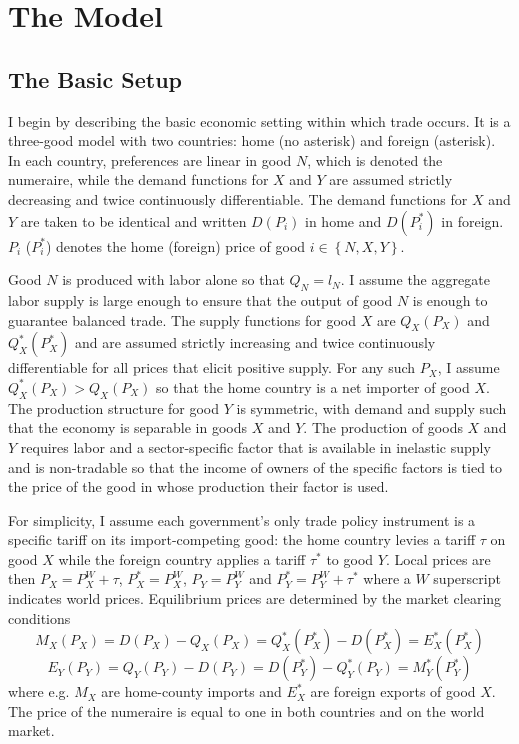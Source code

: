 \documentclass[10pt]{article}
\begin{document}
\section{The Model}
\label{sec:model}

\subsection{The Basic Setup}
\label{sec:basic}
I begin by describing the basic economic setting within which trade occurs. It is a three-good model with two countries: home (no asterisk) and foreign (asterisk). In each country, preferences are linear in good $N$, which is denoted the numeraire, while the demand functions for $X$ and $Y$ are assumed strictly decreasing and twice continuously differentiable. The demand functions for $X$ and $Y$ are taken to be identical and written $D(P_i)$ in home and $D(P_i^*)$ in foreign. $P_i$ ($P_i^*$) denotes the home (foreign) price of good $i \in \left\{N,X,Y\right\}$.

Good $N$ is produced with labor alone so that $Q_N = l_N$. I assume the aggregate labor supply is large enough to ensure that the output of good $N$ is enough to guarantee balanced trade. The supply functions for good $X$ are $Q_X(P_X)$ and $Q_X^*(P_X^*)$ and are assumed strictly increasing and twice continuously differentiable for all prices that elicit positive supply. For any such $P_X$, I assume $Q_X^*(P_X) > Q_X(P_X)$ so that the home country is a net importer of good $X$. The production structure for good $Y$ is symmetric, with demand and supply such that the economy is separable in goods $X$ and $Y$. The production of goods $X$ and $Y$ requires labor and a sector-specific factor that is available in inelastic supply and is non-tradable so that the income of owners of the specific factors is tied to the price of the good in whose production their factor is used. 

For simplicity, I assume each government's only trade policy instrument is a specific tariff on its import-competing good: the home country levies a tariff $\tau$ on good $X$ while the foreign country applies a tariff $\tau^*$ to good $Y$. Local prices are then $P_X = P_X^W + \tau$, $P_X^* = P_X^W$, $P_Y = P_Y^W$ and $P_Y^* = P_Y^W + \tau^*$ where a $W$ superscript indicates world prices. Equilibrium prices are determined by the market clearing conditions
$$M_X(P_X)= D(P_X)-Q_X(P_X) = Q_X^*(P_X^*) - D(P_X^*) = E_X^*(P_X^*)$$
$$E_Y(P_Y)=Q_Y(P_Y)-D(P_Y) = D(P_Y^*)-Q_Y^*(P_Y) = M_Y^*(P_Y^*)$$
where e.g. $M_X$ are home-county imports and $E_X^*$ are foreign exports of good $X$. The price of the numeraire is equal to one in both countries and on the world market.
\end{document}
